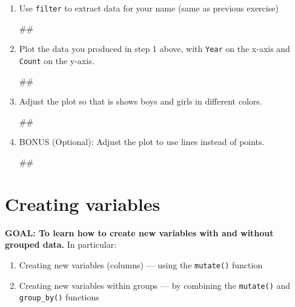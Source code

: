 \documentclass[]{book}
\newenvironment{Shaded}{\begin{snugshade}}{\end{snugshade}}
\newcommand{\NormalTok}[1]{#1}
\providecommand{\tightlist}{%
  \setlength{\itemsep}{0pt}\setlength{\parskip}{0pt}}
\begin{document}
\begin{enumerate}
\def\labelenumi{\arabic{enumi}.}
\item
  Use \texttt{filter} to extract data for your name (same as previous
  exercise)

\begin{Shaded}
\begin{Highlighting}[]
\NormalTok{##}
\end{Highlighting}
\end{Shaded}
\item
  Plot the data you produced in step 1 above, with \texttt{Year} on the
  x-axis and \texttt{Count} on the y-axis.

\begin{Shaded}
\begin{Highlighting}[]
\NormalTok{##}
\end{Highlighting}
\end{Shaded}
\item
  Adjust the plot so that is shows boys and girls in different colors.

\begin{Shaded}
\begin{Highlighting}[]
\NormalTok{##}
\end{Highlighting}
\end{Shaded}
\item
  BONUS (Optional): Adjust the plot to use lines instead of points.

\begin{Shaded}
\begin{Highlighting}[]
\NormalTok{##}
\end{Highlighting}
\end{Shaded}
\end{enumerate}

\section{Creating variables}\label{creating-variables}

\textbf{GOAL: To learn how to create new variables with and without
grouped data.} In particular:

\begin{enumerate}
\def\labelenumi{\arabic{enumi}.}
\tightlist
\item
  Creating new variables (columns) --- using the \texttt{mutate()}
  function
\item
  Creating new variables within groups --- by combining the
  \texttt{mutate()} and \texttt{group\_by()} functions
\end{enumerate}
\end{document}
